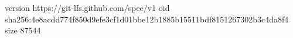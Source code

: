 version https://git-lfs.github.com/spec/v1
oid sha256:4e8acdd774f850d9efe3cf1d01bbe12b1885b15511bdf8151267302b3c4da8f4
size 87544
